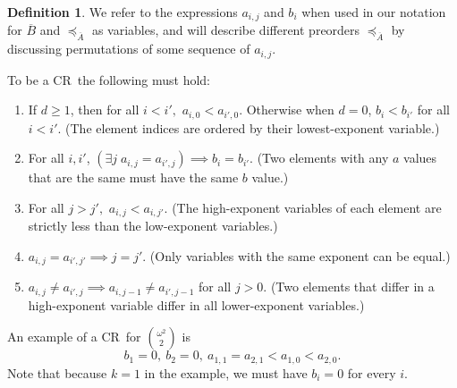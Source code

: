 \documentclass[10pt,a4paper]{article}
\newcommand{\om}{\omega}
\newcommand{\crulenospace}{CR}
\newcommand{\crule}{\crulenospace~}
\newcommand{\crules}{\crulenospace s~}
\newcommand{\xleq}{\preceq_{\overline{A}}}
\newcommand{\assny}{\overline{B}}
\newcommand{\inumpoints}{i}
\newcommand{\idegr}{j}
\newcommand{\commonconst}{a}
\newcommand{\rareconst}{b}
\theoremstyle{plain}
\theoremstyle{definition}
\newtheorem{definition}[theorem]{Definition}
\begin{document}
\begin{definition}
We refer to the expressions $\commonconst_{\inumpoints,\idegr}$ and $\rareconst_\inumpoints$ when used in our notation for $\assny$ and $\xleq$ as variables, and will describe different preorders $\xleq$ by discussing permutations of some sequence of $\commonconst_{\inumpoints,\idegr}$.

To be a \crule the following must hold:

\begin{enumerate}
    \item \label{cr:index-ordering} If $d \geq 1$, then for all $\inumpoints < \inumpoints',$ $\commonconst_{\inumpoints, 0} < \commonconst_{\inumpoints' ,0}.$ Otherwise when $d = 0$, $\rareconst_{\inumpoints} < \rareconst_{\inumpoints'}$ for all $\inumpoints<\inumpoints'$. (The element indices are ordered by their lowest-exponent variable.) 
    \item \label{cr:y-distinct} For all $\inumpoints,\inumpoints'$, $(\exists \idegr\; \commonconst_{\inumpoints,\idegr} = \commonconst_{\inumpoints',\idegr})\implies \rareconst_{\inumpoints} = \rareconst_{\inumpoints'}$. (Two elements with any $\commonconst$ values that are the same must have the same $\rareconst$ value.)
    \item \label{cr:high-first} For all $\idegr > \idegr',$ $\commonconst_{\inumpoints, \idegr} < \commonconst_{\inumpoints, \idegr'}$. (The high-exponent variables of each element are strictly less than the low-exponent variables.)
    \item \label{cr:term-dim-diff} $\commonconst_{\inumpoints, \idegr} = \commonconst_{\inumpoints', \idegr'} \implies \idegr = \idegr'$. (Only variables with the same exponent can be equal.)
    \item \label{cr:high-split} $\commonconst_{\inumpoints, \idegr} \neq \commonconst_{\inumpoints', \idegr} \implies \commonconst_{\inumpoints,\idegr-1} \neq \commonconst_{\inumpoints',\idegr-1}$ for all $\idegr>0$. (Two elements that differ in a high-exponent variable differ in all lower-exponent variables.)
\end{enumerate}

An example of a \crule for $\binom{\om^2}{2}$ is $$\rareconst_1=0,~\rareconst_2=0,~\commonconst_{1, 1} = \commonconst_{2, 1} < \commonconst_{1, 0} < \commonconst_{2, 0}.$$
Note that because $k=1$ in the example, we must have $\rareconst_{\inumpoints} = 0$ for every $\inumpoints$.


\end{definition}
\end{document}
